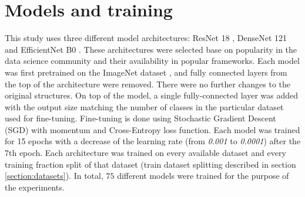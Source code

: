 \section{Models and training}\label{section:models}

This study uses three different model architectures: ResNet 18 \cite{he2015deep}, DenseNet 121 \cite{huang2017densely} and EfficientNet B0 \cite{tan2019efficientnet}. These architectures were selected base on popularity in the data science community and  their availability in popular frameworks. Each model was first pretrained on the ImageNet dataset \cite{imagenet2009}, and fully connected layers from the top of the architecture were removed. There were no further changes to the original structures. On top of the model, a single fully-connected layer was added with the output size matching the number of classes in the particular dataset used for fine-tuning. Fine-tuning is done using Stochastic Gradient Descent (SGD) with momentum \cite{rumelhart1986learning} and Cross-Entropy loss function. Each model was trained for 15 epochs with a decrease of the learning rate (from \textit{0.001} to \textit{0.0001}) after the 7th epoch. Each architecture was trained on every available dataset and every training fraction split of that dataset (train dataset splitting described in section \ref{section:datasets}). In total, $75$ different models were trained for the purpose of the experiments.

